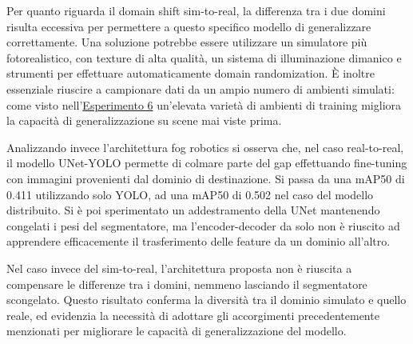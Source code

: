 \documentclass[12pt]{report}
\begin{document}
Per quanto riguarda il domain shift sim-to-real, la differenza tra i due domini risulta eccessiva per permettere a questo specifico modello di generalizzare correttamente. Una soluzione potrebbe essere utilizzare un simulatore più fotorealistico, con texture di alta qualità, un sistema di illuminazione dimanico e strumenti per effettuare automaticamente domain randomization. È inoltre essenziale riuscire a campionare dati da un ampio numero di ambienti simulati: come visto nell'\hyperref[sec:esperimento_6]{Esperimento 6} un'elevata varietà di ambienti di training migliora la capacità di generalizzazione su scene mai viste prima.

Analizzando invece l'architettura fog robotics si osserva che, nel caso real-to-real, il modello UNet-YOLO permette di colmare parte del gap effettuando fine-tuning con immagini provenienti dal dominio di destinazione. Si passa da una mAP50 di 0.411 utilizzando solo YOLO, ad una mAP50 di 0.502 nel caso del modello distribuito. Si è poi sperimentato un addestramento della UNet mantenendo congelati i pesi del segmentatore, ma l'encoder-decoder da solo non è riuscito ad apprendere efficacemente il trasferimento delle feature da un dominio all'altro.

Nel caso invece del sim-to-real, l'architettura proposta non è riuscita a compensare le differenze tra i domini, nemmeno lasciando il segmentatore scongelato. Questo risultato conferma la diversità tra il dominio simulato e quello reale, ed evidenzia la necessità di adottare gli accorgimenti precedentemente menzionati per migliorare le capacità di generalizzazione del modello.

\beforebibliography



\closingpage
\end{document}
